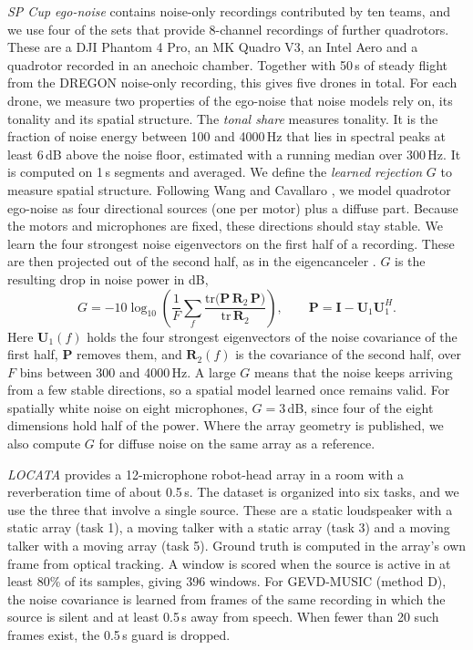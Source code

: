 \documentclass{svproc}
\begin{document}
\emph{SP Cup ego-noise} \cite{deleforge2019spcup} contains noise-only recordings contributed by ten teams, and we use four of the sets that provide 8-channel recordings of further quadrotors.
These are a DJI Phantom 4 Pro, an MK Quadro V3, an Intel Aero and a quadrotor recorded in an anechoic chamber.
Together with 50\,s of steady flight from the DREGON noise-only recording, this gives five drones in total.
For each drone, we measure two properties of the ego-noise that noise models rely on, its tonality and its spatial structure.
The \emph{tonal share} measures tonality.
It is the fraction of noise energy between 100 and 4000\,Hz that lies in spectral peaks at least 6\,dB above the noise floor, estimated with a running median over 300\,Hz.
It is computed on 1\,s segments and averaged.
We define the \emph{learned rejection} $G$ to measure spatial structure.
Following Wang and Cavallaro \cite{wang2016earinthesky}, we model quadrotor ego-noise as four directional sources (one per motor) plus a diffuse part.
Because the motors and microphones are fixed, these directions should stay stable.
We learn the four strongest noise eigenvectors on the first half of a recording.
These are then projected out of the second half, as in the eigencanceler \cite{haimovich1996eigencanceler}.
$G$ is the resulting drop in noise power in dB,
\begin{equation}\label{eq:rej}
G=-10\log_{10}\left(\frac{1}{F}\sum_{f}\frac{\mathrm{tr}\big(\mathbf{P}\,\mathbf{R}_2\,\mathbf{P}\big)}{\mathrm{tr}\,\mathbf{R}_2}\right),\qquad
\mathbf{P}=\mathbf{I}-\mathbf{U}_1\mathbf{U}_1^{H}.
\end{equation}
Here $\mathbf{U}_1(f)$ holds the four strongest eigenvectors of the noise covariance of the first half, $\mathbf{P}$ removes them, and $\mathbf{R}_2(f)$ is the covariance of the second half, over $F$ bins between 300 and 4000\,Hz.
A large $G$ means that the noise keeps arriving from a few stable directions, so a spatial model learned once remains valid.
For spatially white noise on eight microphones, $G=3$\,dB, since four of the eight dimensions hold half of the power.
Where the array geometry is published, we also compute $G$ for diffuse noise on the same array as a reference.

\emph{LOCATA} \cite{lollmann2018locata,evers2020locata} provides a 12-microphone robot-head array in a room with a reverberation time of about 0.5\,s.
The dataset is organized into six tasks, and we use the three that involve a single source.
These are a static loudspeaker with a static array (task 1), a moving talker with a static array (task 3) and a moving talker with a moving array (task 5).
Ground truth is computed in the array's own frame from optical tracking.
A window is scored when the source is active in at least 80\% of its samples, giving 396 windows.
For GEVD-MUSIC (method D), the noise covariance is learned from frames of the same recording in which the source is silent and at least 0.5\,s away from speech.
When fewer than 20 such frames exist, the 0.5\,s guard is dropped.
\end{document}
